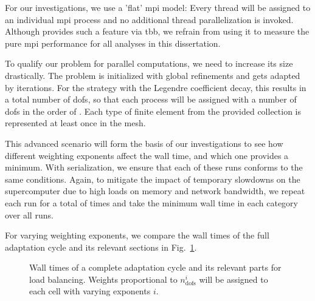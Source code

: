 For our investigations, we use a 'flat' \gls{mpi} model: Every thread will be assigned to an individual \gls{mpi} process and no additional thread parallelization is invoked. Although \dealii{} provides such a feature via \gls{tbb}, we refrain from using it to measure the pure \gls{mpi} performance for all analyses in this dissertation.


To qualify our problem for parallel computations, we need to increase its size drastically. The problem is initialized with  global refinements and gets adapted by  iterations. For the strategy with the Legendre coefficient decay, this results in a total number of  \glspl{dof}, so that each process will be assigned with a number of \glspl{dof} in the order of . Each type of finite element from the provided collection is represented at least once in the mesh.

This advanced scenario will form the basis of our investigations to see how different weighting exponents affect the wall time, and which one provides a minimum. With serialization, we ensure that each of these runs conforms to the same conditions. Again, to mitigate the impact of temporary slowdowns on the supercomputer due to high loads on memory and network bandwidth, we repeat each run for a total of  times and take the minimum wall time in each category over all runs.


For varying weighting exponents, we compare the wall times of the full adaptation cycle and its relevant sections
in Fig.~\ref{fig:weights}.

\begin{figure}
\centering

\caption[Wall times for load balancing with varying weighting exponents.]{Wall times of a complete adaptation cycle and its relevant parts for load balancing. Weights proportional to $n_\text{dofs}^i$ will be assigned to each cell with varying exponents $i$.}
\label{fig:weights}
\end{figure}


